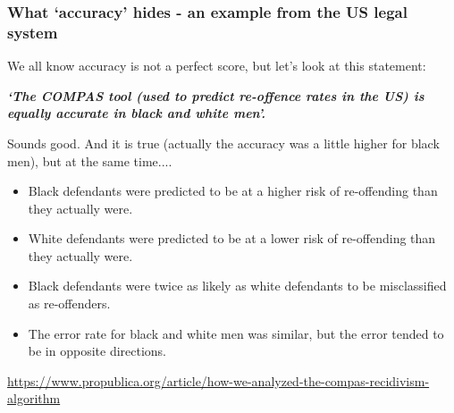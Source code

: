 \begin{frame}
\frametitle{What `accuracy' hides - an example from the US legal system}
\small
We all know accuracy is not a perfect score, but let's look at this statement:

\vspace{2mm}
\textbf{\textit{`The COMPAS tool (used to predict re-offence rates in the US) is equally accurate in black and white men'.}
}
\vspace{3mm}


Sounds good. And it is true (actually the accuracy was a little higher for black men), but at the same time....
\begin{itemize}
    \item Black defendants were predicted to be at a higher risk of re-offending than they actually were. 
    \item White defendants were predicted to be at a lower risk of re-offending than they actually were.
    \item Black defendants were twice as likely as white defendants to be misclassified as re-offenders.
    \item The error rate for black and white men was similar, but the error tended to be in opposite directions.
\end{itemize}

\vspace{3mm}
\tiny
\url{https://www.propublica.org/article/how-we-analyzed-the-compas-recidivism-algorithm}

\end{frame}